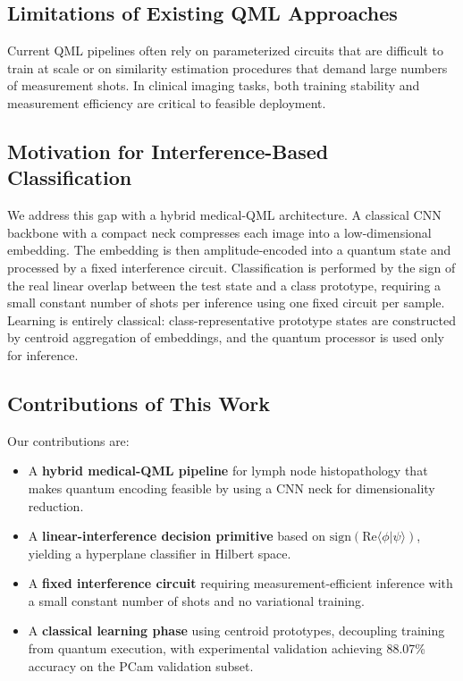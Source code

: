 \documentclass[conference]{IEEEtran}
\begin{document}
\subsection{Limitations of Existing QML Approaches}
Current QML pipelines often rely on parameterized circuits that are difficult to train at scale or on similarity estimation procedures that demand large numbers of measurement shots. In clinical imaging tasks, both training stability and measurement efficiency are critical to feasible deployment.

\subsection{Motivation for Interference-Based Classification}
We address this gap with a hybrid medical-QML architecture. A classical CNN backbone with a compact neck compresses each image into a low-dimensional embedding. The embedding is then amplitude-encoded into a quantum state and processed by a fixed interference circuit. Classification is performed by the sign of the real linear overlap between the test state and a class prototype, requiring a small constant number of shots per inference using one fixed circuit per sample. Learning is entirely classical: class-representative prototype states are constructed by centroid aggregation of embeddings, and the quantum processor is used only for inference.

\subsection{Contributions of This Work}
Our contributions are:
\begin{itemize}
    \item A \textbf{hybrid medical-QML pipeline} for lymph node histopathology that makes quantum encoding feasible by using a CNN neck for dimensionality reduction.
    \item A \textbf{linear-interference decision primitive} based on $\mathrm{sign}(\mathrm{Re}\langle\phi|\psi\rangle)$, yielding a hyperplane classifier in Hilbert space.
    \item A \textbf{fixed interference circuit} requiring measurement-efficient inference with a small constant number of shots and no variational training.
    \item A \textbf{classical learning phase} using centroid prototypes, decoupling training from quantum execution, with experimental validation achieving 88.07\% accuracy on the PCam validation subset.
\end{itemize}
\end{document}
